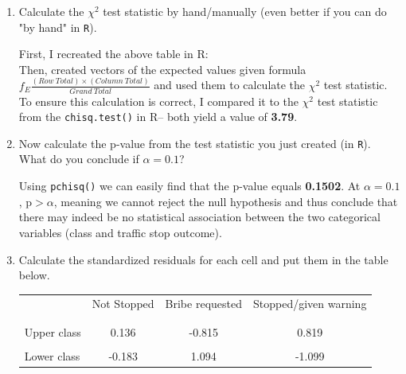 \documentclass[12pt,letterpaper]{article}
\begin{document}
\begin{enumerate}
	
	\item [(a)]
	Calculate the $\chi^2$ test statistic by hand/manually (even better if you can do "by hand" in \texttt{R}).\\
\newpage

	First, I recreated the above table in R:\\
		 
	Then, created vectors of the expected values given formula \(f_{E}\frac{(Row\ Total)\times (Column\ Total)}{Grand\ Total}\) and used them to calculate the $\chi^2$ test statistic. To ensure this calculation is correct, I compared it to the $\chi^2$ test statistic from the \texttt{chisq.test()} in R-- both yield a value of \textbf{3.79}.\\
		  
		
	\item [(b)]
	Now calculate the p-value from the test statistic you just created (in \texttt{R}).  What do you conclude if $\alpha = 0.1$?\\
	\vspace{.1cm}
	
	Using \texttt{pchisq()} we can easily find that the p-value equals \textbf{0.1502}. At $\alpha = 0.1$, p$>\alpha$, meaning we cannot reject the null hypothesis and thus conclude that there may indeed be no statistical association between the two categorical variables (class and traffic stop outcome).\\
		  
		
	\item [(c)] Calculate the standardized residuals for each cell and put them in the table below.
	\vspace{.1cm}
	
	\begin{table}[h]
		\centering
		\begin{tabular}{l | c c c }
			& Not Stopped & Bribe requested & Stopped/given warning \\
			\\[-1.8ex] 
			\hline \\[-1.8ex]
			Upper class  & 0.136 & -0.815 & 0.819 \\
			\\
			Lower class & -0.183 & 1.094 & -1.099  \\
			

\end{tabular}
\end{table}
\end{enumerate}
\end{document}
